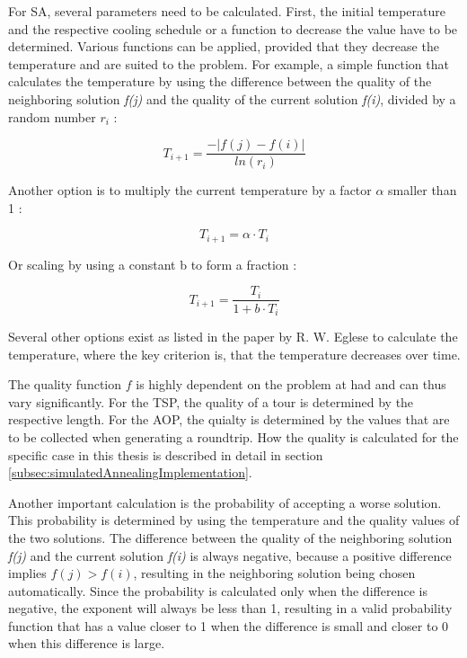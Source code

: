 For SA, several parameters need to be calculated.
First, the initial temperature and the respective cooling schedule or a function to decrease the value have to be determined.
Various functions can be applied, provided that they decrease the temperature and are suited to the problem.
For example, a simple function that calculates the temperature by using the difference between the quality of the neighboring solution \textit{f(j)} and the quality of the current solution \textit{f(i)}, divided by a random number $r_i$ \cite{zhan_list-based_2016}: 

\begin{equation}\label{eq:temperatureSchedule}
	T_{i+1} = \frac{- |f(j)-f(i)|}{ln(r_i)}	
\end{equation}

Another option is to multiply the current temperature by a factor $\alpha$ smaller than 1 \cite{eglese_simulated_1990}:

\begin{equation}\label{eq:temperatureSchedule2}
	T_{i+1} = \alpha \cdot T_i
\end{equation}

Or scaling by using a constant b to form a fraction \cite{eglese_simulated_1990}: 

\begin{equation}\label{eq:temperatureSchedule3}
	T_{i+1} = \frac{T_i}{1 + b \cdot T_i}	
\end{equation}

Several other options exist as listed in the paper by R. W. Eglese \cite{eglese_simulated_1990} to calculate the temperature, where the key criterion is, that the temperature decreases over time.

The quality function $f$ is highly dependent on the problem at had and can thus vary significantly. 
For the TSP, the quality of a tour is determined by the respective length.
For the AOP, the quialty is determined by the values that are to be collected when generating a roundtrip. 
How the quality is calculated for the specific case in this thesis is described in detail in section \ref{subsec:simulatedAnnealingImplementation}.

Another important calculation is the probability of accepting a worse solution.
This probability is determined by using the temperature and the quality values of the two solutions.
The difference between the quality of the neighboring solution \textit{f(j)} and the current solution \textit{f(i)} is always negative, because a positive difference implies $f(j) > f(i)$, resulting in the neighboring solution being chosen automatically.
Since the probability is calculated only when the difference is negative, the exponent will always be less than 1, resulting in a valid probability function that has a value closer to 1 when the difference is small and closer to 0 when this difference is large.


